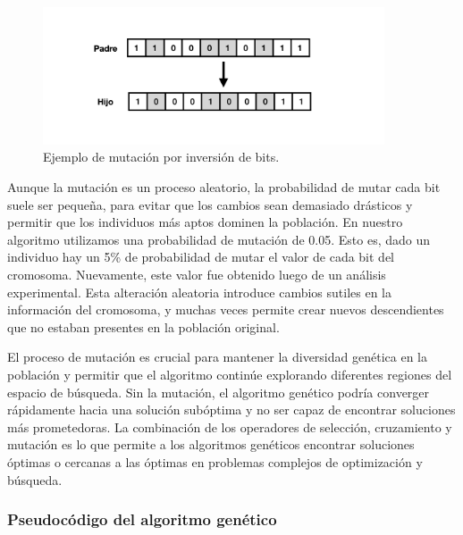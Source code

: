 \begin{figure}[t]
\centering
\includegraphics[width=0.9\textwidth]{images/mutation.png}
\caption{Ejemplo de mutación por inversión de bits.}
\label{fig:mutation}
\end{figure}

Aunque la mutación es un proceso aleatorio, la probabilidad de mutar cada bit suele ser pequeña, para evitar que los cambios sean demasiado drásticos y permitir que los individuos más aptos dominen la población. En nuestro algoritmo utilizamos una probabilidad de mutación de 0.05. Esto es, dado un individuo hay un 5\% de probabilidad de mutar el valor de cada bit del cromosoma. Nuevamente, este valor fue obtenido luego de un análisis experimental. Esta alteración aleatoria introduce cambios sutiles en la información del cromosoma, y muchas veces permite crear nuevos descendientes que no estaban presentes en la población original.

El proceso de mutación es crucial para mantener la diversidad genética en la población y permitir que el algoritmo continúe explorando diferentes regiones del espacio de búsqueda. Sin la mutación, el algoritmo genético podría converger rápidamente hacia una solución subóptima y no ser capaz de encontrar soluciones más prometedoras. La combinación de los operadores de selección, cruzamiento y mutación es lo que permite a los algoritmos genéticos encontrar soluciones óptimas o cercanas a las óptimas en problemas complejos de optimización y búsqueda.




\subsubsection{Pseudocódigo del algoritmo genético}

